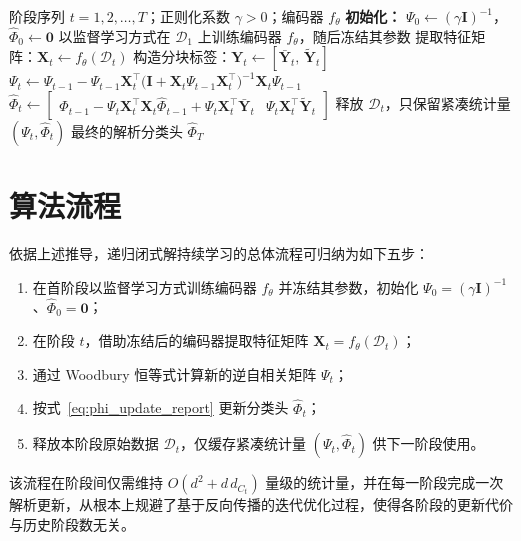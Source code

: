 \begin{algorithm}[t]
\caption{递归岭回归闭式解持续学习（统一算法）}
\label{alg:cfcl_report}
\begin{algorithmic}[1]
\REQUIRE 阶段序列 $t=1,2,\ldots,T$；正则化系数 $\gamma>0$；编码器 $f_\theta$
\STATE \textbf{初始化：} $\Psi_0\leftarrow(\gamma\mathbf{I})^{-1}$，$\widehat{\Phi}_0\leftarrow\mathbf{0}$
\STATE 以监督学习方式在 $\mathcal{D}_1$ 上训练编码器 $f_\theta$，随后冻结其参数
    \STATE 提取特征矩阵：$\mathbf{X}_t\leftarrow f_\theta(\mathcal{D}_t)$
    \STATE 构造分块标签：$\mathbf{Y}_t\leftarrow[\bar{\mathbf{Y}}_t,\,\tilde{\mathbf{Y}}_t]$
    \STATE {}
    \STATE $\Psi_t\leftarrow\Psi_{t-1}-\Psi_{t-1}\mathbf{X}_t^{\top}\big(\mathbf{I}+\mathbf{X}_t\Psi_{t-1}\mathbf{X}_t^{\top}\big)^{-1}\mathbf{X}_t\Psi_{t-1}$
    \STATE {}
    \STATE $\widehat{\Phi}_t\leftarrow\begin{bmatrix}
    \widehat{\Phi}_{t-1}-\Psi_t\mathbf{X}_t^{\top}\mathbf{X}_t\widehat{\Phi}_{t-1}+\Psi_t\mathbf{X}_t^{\top}\bar{\mathbf{Y}}_t & \Psi_t\mathbf{X}_t^{\top}\tilde{\mathbf{Y}}_t
    \end{bmatrix}$
    \STATE 释放 $\mathcal{D}_t$，只保留紧凑统计量 $(\Psi_t,\widehat{\Phi}_t)$
\ENDFOR
\RETURN 最终的解析分类头 $\widehat{\Phi}_T$
\end{algorithmic}
\end{algorithm}

\section{算法流程}

依据上述推导，递归闭式解持续学习的总体流程可归纳为如下五步：
\begin{enumerate}
    \item 在首阶段以监督学习方式训练编码器 $f_\theta$ 并冻结其参数，初始化 $\Psi_0=(\gamma\mathbf{I})^{-1}$、$\widehat{\Phi}_0=\mathbf{0}$；
    \item 在阶段 $t$，借助冻结后的编码器提取特征矩阵 $\mathbf{X}_t=f_\theta(\mathcal{D}_t)$；
    \item 通过 Woodbury 恒等式计算新的逆自相关矩阵 $\Psi_t$；
    \item 按式~\eqref{eq:phi_update_report} 更新分类头 $\widehat{\Phi}_t$；
    \item 释放本阶段原始数据 $\mathcal{D}_t$，仅缓存紧凑统计量 $(\Psi_t,\widehat{\Phi}_t)$ 供下一阶段使用。
\end{enumerate}
该流程在阶段间仅需维持 $O(d^2+d\,d_{C_t})$ 量级的统计量，并在每一阶段完成一次解析更新，从根本上规避了基于反向传播的迭代优化过程，使得各阶段的更新代价与历史阶段数无关。

